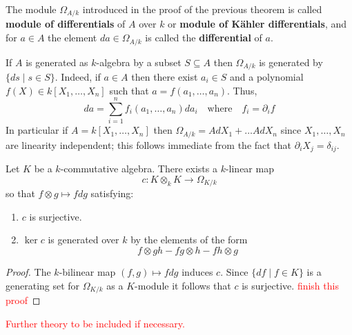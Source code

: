 \begin{definition}\label{def:module-of-differentials}
	The module $\Omega_{A/k}$ introduced in the proof of the previous theorem is called \textbf{module of differentials} of $A$ over $k$ or \textbf{module of Kähler differentials}, and for $a \in A$ the element $da\in \Omega_{A/k}$ is called the \textbf{differential} of $a$.
\end{definition}
\begin{example}\label{ex:differentials-of-polynomials}
	If $A$ is generated as $k$-algebra by a subset $S \subseteq A$ then $\Omega_{A/k}$ is generated by $\{ds\mid s \in S\}$. Indeed, if $a \in A$ then there exist $a_{i}\in S$ and a polynomial $f(X) \in k[X_{1}, \ldots, X_{n}]$ such that $a = f(a_{1}, \ldots, a_{n})$. Thus,
	\[
		da = \sum_{i=1}^{n} f_{i}(a_{1}, \ldots, a_{n})da_{i} \quad \text{where}\quad f_{i} = \partial_{i}f
	\]
	In particular if $A = k[X_{1}, \ldots, X_{n}]$ then $\Omega_{A/k} = A dX_{1} + \ldots A dX_{n}$ since $X_{1}, \ldots, X_{n}$ are linearity independent; this follows immediate from the fact that $\partial_{i} X_{j} = \delta_{ij}$.
\end{example}
\begin{lemma}\label{lemm:c-map-differentials}
	Let $K$ be a $k$-commutative algebra. There exists a $k$-linear map
	\[
		c\colon K \otimes_{k} K \to \Omega_{K/k}
	\]
	so that $f \otimes g \mapsto fdg$ satisfying:
	\begin{enumerate}[label = (\roman*)]
		\item $c$ is surjective.
		\item $\ker c$ is generated over $k$ by the elements of the form
		\[
			f \otimes gh - fg \otimes h - fh \otimes g
		\]
	\end{enumerate}
\end{lemma}
\begin{proof}
	The $k$-bilinear map $(f,g) \mapsto fdg$ induces $c$. Since $\{df \mid f\in K\}$ is a generating set for $\Omega_{K/k}$ as a $K$-module it follows that $c$ is surjective. \textcolor{red}{finish this proof}
\end{proof}


\textcolor{red}{Further theory to be included if necessary.}

